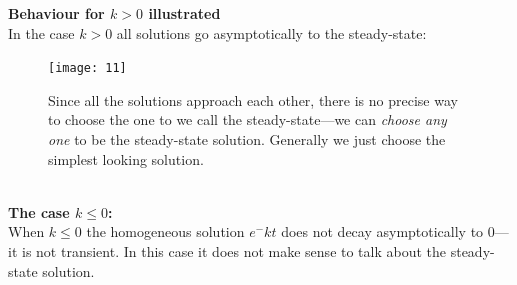 \documentclass{report}
\begin{document}
\newpage
\noindent\textbf{Behaviour for $k>0$ illustrated}\\
In the case $k>0$ all solutions go asymptotically to the 
steady-state:
\begin{figure}[h]
\begin{center}
\texttt{[image: 11]}\\
\end{center}
Since all the solutions approach each other, there is no precise way to choose the one to we call the 
steady-state---we can \textit{choose any one} to be the steady-state solution. 
Generally we just choose the simplest looking solution.
\end{figure}\\
\textbf{The case $k\leq0$:}\\
When $k\leq0$ the homogeneous solution $e^-{kt}$ does not decay asymptotically to 0---it is not transient. In this
case it does not make sense to talk about the steady-state solution.
\newpage
\end{document}
